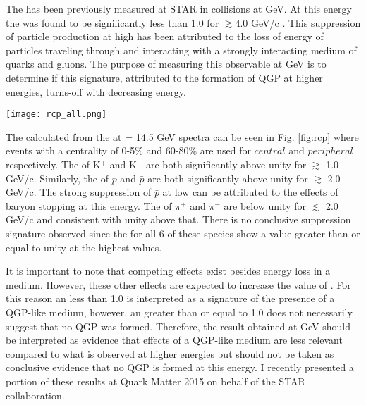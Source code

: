 	The \rcp has been previously measured at STAR in \auau collisions at  GeV. At this energy the \rcp was found to be significantly less than 1.0 for \pt $\gtrsim$4.0 GeV/c \cite{starcollaboration_transversemomentum_2003}. This suppression of particle production at high \pt has been attributed to the loss of energy of particles traveling through and interacting with a strongly interacting medium of quarks and gluons. The purpose of measuring this observable at  GeV is to determine if this signature, attributed to the formation of QGP at higher \snn energies, turns-off with decreasing \snn energy.

	\begin{sidewaysfigure}[p]
		\centering 
		\texttt{[image: rcp\_all.png]} 

		\centering
		\caption{ \label{fig:rcp} The \rcp for \auau at  GeV for events with a centrality of (C=)0-5\% over those with (P=)60-80\%\cite{brandenburg_identified}. The large (red) error bar on the right hand side of each plot corresponds to the correlated uncertainty due to the MC Glauber calculation of $N_{coll}$ (See Section \ref{sec:mc_glauber}. A portion of these results will be published in my upcoming Quark Matter 2015 proceedings. } 
	\end{sidewaysfigure}
	\afterpage{\clearpage}


	The \rcp calculated from the \auau at \snn = 14.5 GeV spectra can be seen in Fig. \ref{fig:rcp} where events with a centrality of 0-5\% and 60-80\% are used for $central$ and $peripheral$ respectively. The \rcp of K$^+$ and K$^-$ are both significantly above unity for \pt $\gtrsim$ 1.0 GeV/c. Similarly, the \rcp of $p$ and $\bar{p}$ are both significantly above unity for \pt $\gtrsim$ 2.0 GeV/c. The strong suppression of $\bar{p}$ at low \pt can be attributed to the effects of baryon stopping at this \snn energy. The \rcp of $\pi^{+}$ and $\pi^{-}$ are below unity for \pt $\lesssim$ 2.0 GeV/c and consistent with unity above that. There is no conclusive suppression signature observed since the \rcp for all 6 of these species show a value greater than or equal to unity at the highest \pt values. 

	It is important to note that competing effects exist besides energy loss in a medium. However, these other effects are expected to increase the value of \rcp. For this reason an \rcp less than 1.0 is interpreted as a signature of the presence of a QGP-like medium, however, an \rcp greater than or equal to 1.0 does not necessarily suggest that no QGP was formed. Therefore, the \rcp result obtained at  GeV should be interpreted as evidence that effects of a QGP-like medium are less relevant compared to what is observed at higher \snn energies but should not be taken as conclusive evidence that no QGP is formed at this energy. I recently presented a portion of these results at Quark Matter 2015 on behalf of the STAR collaboration\cite{brandenburg_identified}.